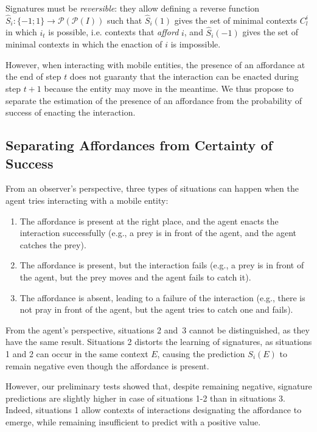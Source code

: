 \documentclass[conference]{IEEEtran}
\begin{document}
Signatures must be \textit{reversible}: they allow defining a reverse function $\hat{S}_i : \{-1;1\} \rightarrow \mathcal{P}(\mathcal{P}(I))$ such that  $\hat{S}_i(1)$ gives the set of minimal contexts $C_l^i$ in which $i_t$ is possible, i.e. contexts that \textit{afford} $i$, and $\hat{S}_i(-1)$ gives the set of minimal contexts in which the enaction of $i$ is impossible.


However, when interacting with mobile entities, the presence of an affordance at the end of step $t$ does not guaranty that the interaction can be enacted during step $t+1$ because the entity may move in the meantime. We thus propose to separate the estimation of the presence of an affordance from the probability of success of enacting the interaction.




\subsection{Separating Affordances from Certainty of Success}\label{separate}

From an observer's perspective, three types of situations can happen when the agent tries interacting with a mobile entity:

\begin{enumerate}
\item The affordance is present at the right place, and the agent enacts the interaction successfully (e.g., a prey is in front of the agent, and the agent catches the prey).
\item The affordance is present, but the interaction fails (e.g., a prey is in front of the agent, but the prey moves and the agent fails to catch it).
\item The affordance is absent, leading to a failure of the interaction (e.g., there is not pray in front of the agent, but the agent tries to catch one and fails).
\end{enumerate}

From the agent's perspective, situations 2 and~3 cannot be distinguished, as they have the same result.
Situations 2 distorts the learning of signatures, as situations 1 and 2 can occur in the same context $E$, causing the prediction $S_i(E)$ to remain negative even though the affordance is present.


However, our preliminary tests showed that, despite remaining negative, signature predictions are slightly higher in case of situations 1-2 than in situations 3. Indeed, situations 1 allow contexts of interactions designating the affordance to emerge, while remaining insufficient to predict with a positive value.
\end{document}

